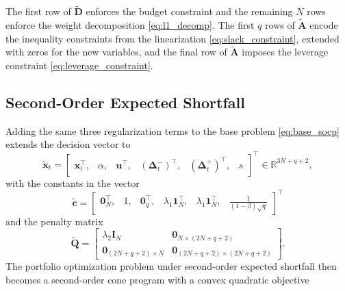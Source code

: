 The first row of $\tilde{\bm{D}}$ enforces the budget constraint and the remaining $N$ rows
enforce the weight decomposition \eqref{eq:l1_decomp}. The first $q$ rows of $\tilde{\bm{A}}$
encode the inequality constraints from the linearization \eqref{eq:slack_constraint}, extended with zeros for the new
variables, and the final row of $\tilde{\bm{A}}$ imposes the leverage constraint \eqref{eq:leverage_constraint}.

\subsection{Second-Order Expected Shortfall} \label{app:reg_socp}

Adding the same three regularization terms to the base problem \eqref{eq:base_socp} extends the decision vector to
\begin{equation*}
    \tilde{\bm{x}}_t = \begin{bmatrix} \bm{x}_t^\top,& \alpha,& \bm{u}^\top,& (\bm{\Delta}_t^-)^\top,& (\bm{\Delta}_t^+)^\top,& s \end{bmatrix}^\top
    \in \mathbb{R}^{3N+q+2},
\end{equation*}
with the constants in the vector
\begin{equation*}
    \tilde{\bm{c}} = \begin{bmatrix} \bm{0}_N^\top,& 1,& \bm{0}_q^\top,& \lambda_1 \bm{1}_N^\top,& \lambda_1 \bm{1}_N^\top,& \tfrac{1}{(1-\beta)\sqrt{q}} \end{bmatrix}^\top
\end{equation*}
and the penalty matrix
\begin{equation*}
    \tilde{\bm{Q}} =
    \begin{bmatrix}
        \lambda_2 \bm{I}_N & \bm{0}_{N \times (2N+q+2)} \\
        \bm{0}_{(2N+q+2) \times N} & \bm{0}_{(2N+q+2) \times (2N+q+2)}
    \end{bmatrix}.
\end{equation*}
The portfolio optimization problem under second-order expected shortfall then becomes a second-order cone program
with a convex quadratic objective
